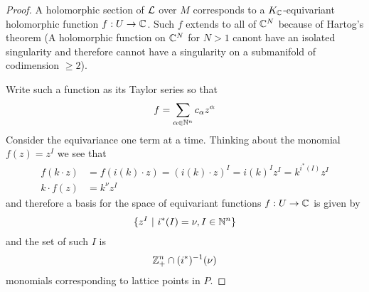 \begin{proof}
    A holomorphic section of ${\mathcal{L}}$ over $M$ corresponds to a $K_{\mathbb{C}}$-equivariant holomorphic function $f:U\to \mathbb{C}$. 
    Such $f$ extends to all of $\mathbb{C}^N$ because of Hartog's theorem (A holomorphic function on $\mathbb{C}^N$ for $N>1$ canont have 
    an isolated singularity and therefore cannot have a singularity on a submanifold of codimension $\geq 2$).

    Write such a function as its Taylor series so that \begin{align*}
        f = \sum_{\alpha\in\mathbb{N}^n} c_\alpha z^\alpha
    \end{align*} Consider the equivariance one term at a time. 
    Thinking about the monomial $f(z) = z^I$ we 
    see that \begin{align*}
        f(k\cdot z) &= f(i(k)\cdot z) = (i(k)\cdot z)^I = i(k)^Iz^I = k^{i^*(I)}z^I \\
        k\cdot f(z) &= k^{\nu}z^I
    \end{align*} and therefore a basis for the space of equivariant functions $f:U\to \mathbb{C}$ 
    is given by \begin{align*}
        \{z^I \ \vert \  i^*(I) = \nu, I\in\mathbb{N}^n\}
    \end{align*} and the set of such $I$ is \begin{align*}
        \mathbb{Z}^n_+ \cap (i^*)^{-1}(\nu)
    \end{align*} monomials corresponding to lattice points in $P$.
\end{proof}

